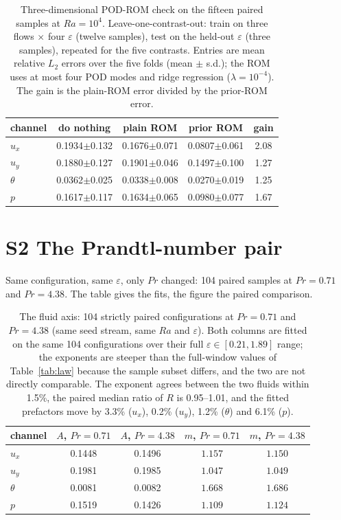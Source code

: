 \documentclass[preprint,11pt,a4paper,times]{elsarticle}
\begin{document}
\begin{table}[htbp]
\centering
\small
\caption{Three-dimensional POD-ROM check on the fifteen paired samples at $Ra=10^4$.
Leave-one-contrast-out: train on three flows $\times$ four $\varepsilon$
(twelve samples), test on the held-out $\varepsilon$ (three samples), repeated
for the five contrasts. Entries are mean relative $L_2$ errors over the five
folds (mean $\pm$ s.d.); the ROM uses at most four POD modes and ridge regression
($\lambda=10^{-4}$). The gain is the plain-ROM error divided by the prior-ROM error.}
\label{tab:s3drom}
\begin{tabular}{@{}lcccc@{}}
\toprule
channel & do nothing & plain ROM & prior ROM & gain\\
\midrule
$u_x$ & 0.1934$\pm$0.132 & 0.1676$\pm$0.071 & 0.0807$\pm$0.061 & 2.08\\
$u_y$ & 0.1880$\pm$0.127 & 0.1901$\pm$0.046 & 0.1497$\pm$0.100 & 1.27\\
$\theta$ & 0.0362$\pm$0.025 & 0.0338$\pm$0.008 & 0.0270$\pm$0.019 & 1.25\\
$p$ & 0.1617$\pm$0.117 & 0.1634$\pm$0.065 & 0.0980$\pm$0.077 & 1.67\\
\bottomrule
\end{tabular}
\end{table}

\section*{S2 The Prandtl-number pair}
Same configuration, same $\varepsilon$, only $Pr$ changed: 104 paired samples at
$Pr=0.71$ and $Pr=4.38$. The table gives the fits, the figure the paired comparison.

\begin{table}[htbp]
\centering
\footnotesize
\setlength{\tabcolsep}{3pt}
\caption{The fluid axis: 104 strictly paired configurations at $Pr=0.71$ and $Pr=4.38$ (same seed
stream, same $Ra$ and $\varepsilon$). Both columns are fitted on the same 104 configurations over
their full $\varepsilon\in[0.21,1.89]$ range; the exponents are steeper than the full-window
values of Table~\ref{tab:law} because the sample subset differs, and the two are not directly
comparable. The exponent agrees between the two fluids within 1.5\%, the paired median ratio of $R$ is
0.95--1.01, and the fitted prefactors move by 3.3\% ($u_x$), 0.2\% ($u_y$), 1.2\% ($\theta$) and
6.1\% ($p$).}
\label{tab:water}
\begin{tabular}{@{}lcccc@{}}
\toprule
channel & $A$, $Pr=0.71$ & $A$, $Pr=4.38$ & $m$, $Pr=0.71$ & $m$, $Pr=4.38$\\
\midrule
$u_x$ & 0.1448 & 0.1496 & $1.157$ & $1.150$\\
$u_y$ & 0.1981 & 0.1985 & $1.047$ & $1.049$\\
$\theta$ & 0.0081 & 0.0082 & $1.668$ & $1.686$\\
$p$ & 0.1519 & 0.1426 & $1.109$ & $1.124$\\
\bottomrule
\end{tabular}
\end{table}
\end{document}
